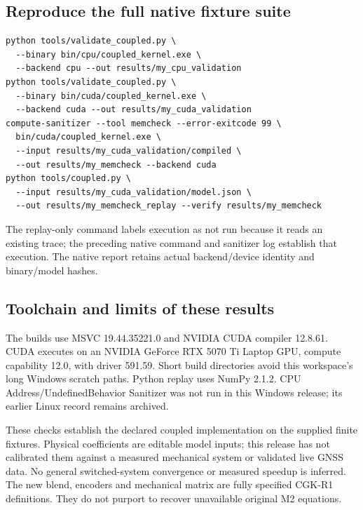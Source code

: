 \subsection{Reproduce the full native fixture suite}
\begin{lstlisting}
python tools/validate_coupled.py \
  --binary bin/cpu/coupled_kernel.exe \
  --backend cpu --out results/my_cpu_validation
python tools/validate_coupled.py \
  --binary bin/cuda/coupled_kernel.exe \
  --backend cuda --out results/my_cuda_validation
compute-sanitizer --tool memcheck --error-exitcode 99 \
  bin/cuda/coupled_kernel.exe \
  --input results/my_cuda_validation/compiled \
  --out results/my_memcheck --backend cuda
python tools/coupled.py \
  --input results/my_cuda_validation/model.json \
  --out results/my_memcheck_replay --verify results/my_memcheck
\end{lstlisting}
The replay-only command labels execution as not run because it reads an existing
trace; the preceding native command and sanitizer log establish that execution.
The native report retains actual backend/device identity and binary/model hashes.

\subsection{Toolchain and limits of these results}
The builds use MSVC 19.44.35221.0 and NVIDIA CUDA compiler 12.8.61. CUDA executes
on an NVIDIA GeForce RTX 5070 Ti Laptop GPU, compute capability 12.0, with driver
591.59. Short build directories avoid this workspace's long Windows scratch paths.
Python replay uses NumPy 2.1.2. CPU Address/UndefinedBehavior Sanitizer was not run
in this Windows release; its earlier Linux record remains archived.

These checks establish the declared coupled implementation on the supplied finite
fixtures. Physical coefficients are editable model inputs; this release has not
calibrated them against a measured mechanical system or validated live GNSS data.
No general switched-system convergence or measured speedup is inferred. The new
blend, encoders and mechanical matrix are fully specified CGK-R1 definitions.
They do not purport to recover unavailable original M2 equations.
\clearpage
\clearpage

